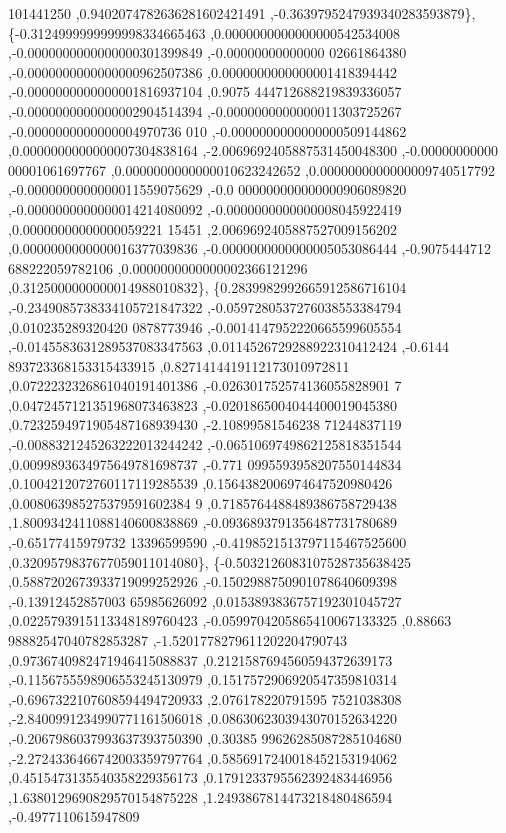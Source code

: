 \begin{DoxyCode}
      101441250 ,0.9402074782636281602421491 ,-0.3639795247939340283593879\},
\{-0.3124999999999998334665463 ,0.0000000000000000542534008 ,-0.0000000000000000301399849 ,-0.00000000000000
      02661864380 ,-0.0000000000000000962507386 ,0.0000000000000001418394442 ,-0.0000000000000001816937104 ,0.9075
      444712688219839336057 ,-0.0000000000000002904514394 ,-0.0000000000000011303725267 ,-0.0000000000000004970736
      010 ,-0.0000000000000000509144862 ,0.0000000000000007304838164 ,-2.0069692405887531450048300 ,-0.00000000000
      00001061697767 ,0.0000000000000010623242652 ,0.0000000000000009740517792 ,-0.0000000000000011559075629 ,-0.0
      000000000000000906089820 ,-0.0000000000000014214080092 ,-0.0000000000000008045922419 ,0.00000000000000059221
      15451 ,2.0069692405887527009156202 ,0.0000000000000016377039836 ,-0.0000000000000005053086444 ,-0.9075444712
      688222059782106 ,0.0000000000000002366121296 ,0.3125000000000014988010832\},
\{0.2839982992665912586716104 ,-0.2349085738334105721847322 ,-0.0597280537276038553384794 ,0.010235289320420
      0878773946 ,-0.0014147952220665599605554 ,-0.0145583631289537083347563 ,0.0114526729288922310412424 ,-0.6144
      893723368153315433915 ,0.8271414419112173010972811 ,0.0722232326861040191401386 ,-0.026301752574136055828901
      7 ,0.0472457121351968073463823 ,-0.0201865004044400019045380 ,0.7232594971905487168939430 ,-2.10899581546238
      71244837119 ,-0.0088321245263222013244242 ,-0.0651069749862125818351544 ,0.0099893634975649781698737 ,-0.771
      0995593958207550144834 ,0.1004212072760117119285539 ,0.1564382006974647520980426 ,0.008063985275379591602384
      9 ,0.7185764488489386758729438 ,1.8009342411088140600838869 ,-0.0936893791356487731780689 ,-0.65177415979732
      13396599590 ,-0.4198521513797115467525600 ,0.3209579837677059011014080\},
\{-0.5032126083107528735638425 ,0.5887202673933719099252926 ,-0.1502988750901078640609398 ,-0.13912452857003
      65985626092 ,0.0153893836757192301045727 ,0.0225793915113348189760423 ,-0.0599704205865410067133325 ,0.88663
      98882547040782853287 ,-1.5201778279611202204790743 ,0.9736740982471946415088837 ,0.2121587694560594372639173
       ,-0.1156755598906553245130979 ,0.1517572906920547359810314 ,-0.6967322107608594494720933 ,2.076178220791595
      7521038308 ,-2.8400991234990771161506018 ,0.0863062303943070152634220 ,-0.2067986037993637393750390 ,0.30385
      99626285087285104680 ,-2.2724336466742003359797764 ,0.5856917240018452153194062 ,0.4515473135540358229356173
       ,0.1791233795562392483446956 ,1.6380129690829570154875228 ,1.2493867814473218480486594 ,-0.4977110615947809

\end{DoxyCode}
